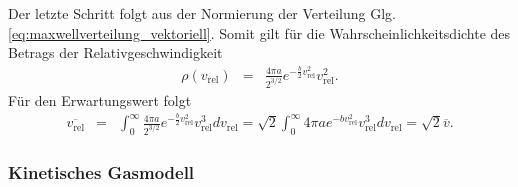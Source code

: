 \documentclass{book}
\newcommand\newoverline[1]{%
\overline{#1}}
\begin{document}
%
Der letzte Schritt folgt aus der Normierung der Verteilung Glg. \eqref{eq:maxwellverteilung_vektoriell}. Somit gilt für die Wahrscheinlichkeitsdichte des Betrags der Relativgeschwindigkeit
%
\begin{eqnarray}
\rho\left(v_{\text{rel}}\right) & = & \frac{4\pi a}{2^{3/2}}e^{-\frac{b}{2}v_{\text{rel}}^2}v_{\text{rel}}^2.
\end{eqnarray}
%
Für den Erwartungswert folgt
%
\begin{eqnarray}
\newoverline{v_{\text{rel}}} & = & \int_{0}^{\infty}\frac{4\pi a}{2^{3/2}}e^{-\frac{b}{2}v_{\text{rel}}^2}v_{\text{rel}}^3dv_{\text{rel}} = \sqrt{2}\int_{0}^{\infty}4\pi ae^{-bv_{\text{rel}}^2}v_{\text{rel}}^3dv_{\text{rel}} = \sqrt{2}\newoverline{v}.\label{eq:mittlere_rel_gesch}
\end{eqnarray}
%
\subsubsection{Kinetisches Gasmodell}
\label{sec:kinetisches_gasmodell}
\end{document}
